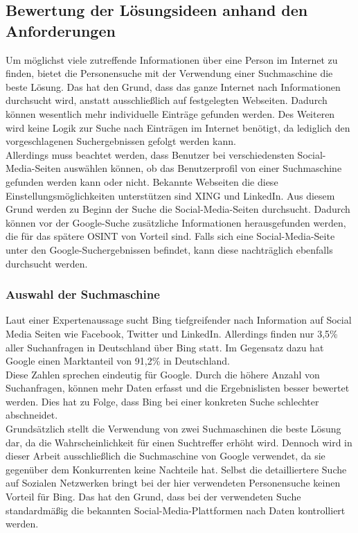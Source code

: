		\subsection{Bewertung der Lösungsideen anhand den Anforderungen}
		Um möglichst viele zutreffende Informationen über eine Person im Internet zu finden, bietet die Personensuche mit der Verwendung einer Suchmaschine die beste Lösung. Das hat den Grund, dass das ganze Internet nach Informationen durchsucht wird, anstatt ausschließlich auf festgelegten Webseiten. Dadurch können wesentlich mehr individuelle Einträge gefunden werden. Des Weiteren wird keine Logik zur Suche nach Einträgen im Internet benötigt, da lediglich den vorgeschlagenen Suchergebnissen gefolgt werden kann.\\
		Allerdings muss beachtet werden, dass Benutzer bei verschiedensten Social-Media-Seiten auswählen können, ob das Benutzerprofil von einer Suchmaschine gefunden werden kann oder nicht. Bekannte Webseiten die diese Einstellungsmöglichkeiten unterstützen sind XING und LinkedIn. Aus diesem Grund werden zu Beginn der Suche die Social-Media-Seiten durchsucht. Dadurch können vor der Google-Suche zusätzliche Informationen herausgefunden werden, die für das spätere OSINT von Vorteil sind. Falls sich eine Social-Media-Seite unter den Google-Suchergebnissen befindet, kann diese nachträglich ebenfalls durchsucht werden.
		
			\subsubsection{Auswahl der Suchmaschine}
			Laut einer Expertenaussage sucht Bing tiefgreifender nach Information auf Social Media Seiten wie Facebook, Twitter und LinkedIn. Allerdings finden nur 3,5\% aller Suchanfragen in Deutschland über Bing statt. Im Gegensatz dazu hat Google einen Marktanteil von 91,2\% in Deutschland. \cite{Suchmaschinen}\\
			Diese Zahlen sprechen eindeutig für Google. Durch die höhere Anzahl von Suchanfragen, können mehr Daten erfasst und die Ergebnislisten besser bewertet werden. Dies hat zu Folge, dass Bing bei einer konkreten Suche schlechter abschneidet. \\
			Grundsätzlich stellt die Verwendung von zwei Suchmaschinen die beste Lösung dar, da die Wahrscheinlichkeit für einen Suchtreffer erhöht wird. Dennoch wird in dieser Arbeit ausschließlich die Suchmaschine von Google verwendet, da sie gegenüber dem Konkurrenten keine Nachteile hat. Selbst die detailliertere Suche auf Sozialen Netzwerken bringt bei der hier verwendeten Personensuche keinen Vorteil für Bing. Das hat den Grund, dass bei der verwendeten Suche standardmäßig die bekannten Social-Media-Plattformen nach Daten kontrolliert werden. 
		 	
